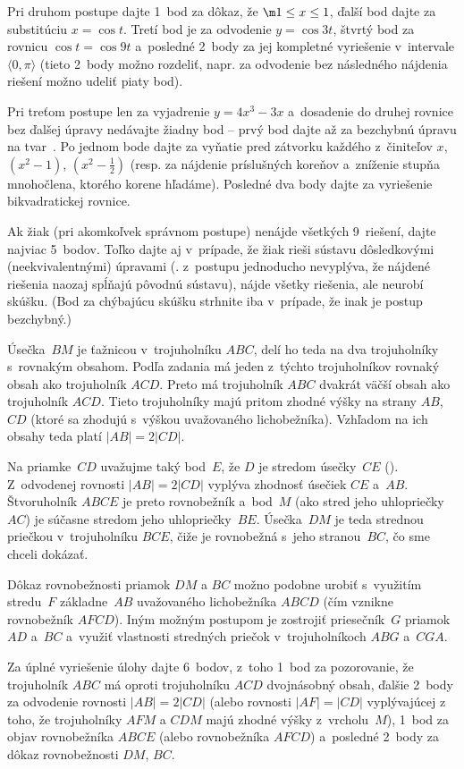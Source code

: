 {Pri druhom postupe dajte 1~bod za dôkaz, že $\m1\le x\le 1$, ďalší bod dajte za substitúciu $x=\cos t$. Tretí bod je za odvodenie $y=\cos 3t$, štvrtý bod za rovnicu $\cos t=\cos9t$ a~posledné 2~body za jej kompletné vyriešenie v~intervale $\langle0,\pi\rangle$ (tieto 2~body možno rozdeliť, napr. za odvodenie  bez následného nájdenia riešení možno udeliť piaty bod).

Pri treťom postupe len za vyjadrenie $y=4x^3-3x$ a~dosadenie do druhej rovnice bez ďalšej úpravy nedávajte žiadny bod -- prvý bod dajte až za bezchybnú úpravu na tvar~. Po jednom bode dajte za vyňatie pred zátvorku každého z~činiteľov $x$, $(x^2-1)$, $(x^2-\frac12)$ (resp. za nájdenie príslušných koreňov a~zníženie stupňa mnohočlena, ktorého korene hľadáme). Posledné dva body dajte za vyriešenie bikvadratickej rovnice.

Ak žiak (pri akomkoľvek správnom postupe) nenájde všetkých 9~riešení, dajte najviac 5~bodov. Toľko dajte aj v~prípade, že žiak rieši sústavu dôsledkovými (neekvivalentnými) úpravami (\tj. z~postupu jednoducho nevyplýva, že nájdené riešenia naozaj spĺňajú pôvodnú sústavu), nájde všetky riešenia, ale neurobí skúšku. (Bod za chýbajúcu skúšku strhnite iba v~prípade, že inak je postup bezchybný.)
\endpetit
\bigbreak
}

{%
Úsečka~$BM$ je ťažnicou v~trojuholníku $ABC$, delí ho teda na dva trojuholníky s~rovnakým obsahom. Podľa zadania má jeden z~týchto trojuholníkov rovnaký obsah ako trojuholník $ACD$. Preto má trojuholník $ABC$ dvakrát väčší obsah ako trojuholník $ACD$. Tieto trojuholníky majú pritom zhodné výšky na strany $AB$, $CD$ (ktoré sa zhodujú s~výškou uvažovaného lichobežníka). Vzhľadom na ich obsahy teda platí $|AB|=2|CD|$.
%

Na priamke~$CD$ uvažujme taký bod~$E$, že $D$ je stredom úsečky~$CE$ (\obr). Z~odvodenej rovnosti $|AB|=2|CD|$ vyplýva zhodnosť
úsečiek $CE$ a~$AB$. Štvoruholník $ABCE$ je preto rovnobežník a~bod~$M$ (ako stred jeho uhlopriečky~$AC$) je súčasne stredom jeho uhlopriečky~$BE$. Úsečka~$DM$ je teda strednou priečkou v~trojuholníku $BCE$, čiže je rovnobežná s~jeho stranou~$BC$, čo sme chceli dokázať.

\poznamka
Dôkaz rovnobežnosti priamok $DM$ a $BC$ možno podobne urobiť s~využitím stredu~$F$ základne~$AB$ uvažovaného lichobežníka $ABCD$ (čím vznikne rovnobežník $AFCD$). Iným možným postupom je zostrojiť priesečník~$G$ priamok $AD$ a~$BC$ a~využiť vlastnosti stredných priečok v~trojuholníkoch $ABG$ a~$CGA$.

\nobreak\medskip\petit\noindent
Za úplné vyriešenie úlohy dajte 6~bodov, z~toho 1~bod za pozorovanie, že trojuholník $ABC$ má oproti trojuholníku $ACD$ dvojnásobný obsah, ďalšie 2~body za odvodenie rovnosti $|AB|=2|CD|$ (alebo rovnosti $|AF|=|CD|$ vyplývajúcej z toho, že trojuholníky $AFM$ a $CDM$ majú
zhodné výšky z~vrcholu~$M$), 1~bod za objav rovnobežníka $ABCE$ (alebo rovnobežníka $AFCD$) a~posledné 2~body za dôkaz rovnobežnosti $DM$, $BC$.
\endpetit
\bigbreak
}

